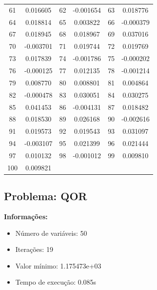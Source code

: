 \documentclass[12pt]{article}
\begin{document}
\begin{longtable}{@{}cc|cc|cc@{}}
61 & 0.016605 & 62 & -0.001654 & 63 & 0.018776 \\
64 & 0.018814 & 65 & 0.003822 & 66 & -0.000379 \\
67 & 0.018945 & 68 & 0.018967 & 69 & 0.037016 \\
70 & -0.003701 & 71 & 0.019744 & 72 & 0.019769 \\
73 & 0.017839 & 74 & -0.001786 & 75 & -0.000202 \\
76 & -0.000125 & 77 & 0.012135 & 78 & -0.001214 \\
79 & 0.008770 & 80 & 0.008801 & 81 & 0.004864 \\
82 & -0.000478 & 83 & 0.030051 & 84 & 0.030275 \\
85 & 0.041453 & 86 & -0.004131 & 87 & 0.018482 \\
88 & 0.018530 & 89 & 0.026168 & 90 & -0.002616 \\
91 & 0.019573 & 92 & 0.019543 & 93 & 0.031097 \\
94 & -0.003107 & 95 & 0.021399 & 96 & 0.021444 \\
97 & 0.010132 & 98 & -0.001012 & 99 & 0.009810 \\
100 & 0.009821 &  &  &  &  \\

\end{longtable}


\newpage            
\subsection{Problema: QOR}

\textbf{Informações:}
\begin{itemize}
\item Número de variáveis: 50
\item Iterações: 19
\item Valor mínimo: 1.175473e+03
\item Tempo de execução: 0.085s
\end{itemize}
\end{document}

